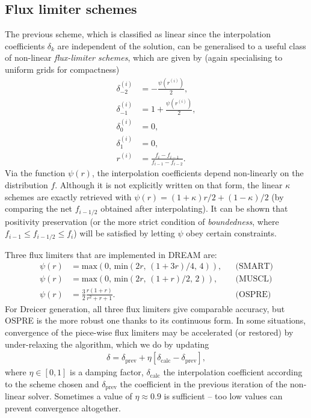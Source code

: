 \documentclass{notes}
\begin{document}
    \subsection{Flux limiter schemes}
    The previous scheme, which is classified as linear since the interpolation 
    coefficients $\delta_k$ are independent of the solution, can be generalised to a 
    useful class of non-linear \emph{flux-limiter schemes}, which are given by
    (again specialising to uniform grids for compactness)
    \begin{align}
    \delta^{(i)}_{-2} &= -\frac{\psi(r^{(i)})}{2}, \nonumber \\
    \delta^{(i)}_{-1} &= 1 + \frac{\psi(r^{(i)})}{2}, \nonumber \\
    \delta^{(i)}_{0} &= 0, \nonumber \\
    \delta^{(i)}_{1} &= 0, \nonumber \\
    r^{(i)} &= \frac{f_i - f_{i-1}}{f_{i-1}-f_{i-2}}.
    \end{align}
    Via the function $\psi(r)$, the interpolation coefficients depend non-linearly on 
    the distribution $f$. Although it is not explicitly written on that form, the linear $\kappa$ schemes 
    are exactly retrieved with $\psi(r) = (1+\kappa)r/2 + (1-\kappa)/2$ (by comparing the net $f_{i-1/2}$ 
    obtained after interpolating). It can be shown that positivity preservation (or the more strict condition 
    of \emph{boundedness}, where $f_{i-1} \leq f_{i-1/2} \leq f_i$)
    will be satisfied by letting $\psi$ obey certain constraints.
    
    Three flux limiters that are implemented in DREAM are:
    \begin{align}
    \psi(r) &= \text{max}(0,\,\text{min}(2r,\,(1+3r)/4,\,4)), && \text{(SMART)} \nonumber \\
    \psi(r) &= \text{max}(0,\,\text{min}(2r,\,(1+r)/2,\,2)), && \text{(MUSCL)} \nonumber \\
    \psi(r) &= \frac{3}{2}\frac{r(1+r)}{r^2+r+1}. && \text{(OSPRE)}
    \end{align}
    For Dreicer generation, all three flux limiters give comparable accuracy, but OSPRE is the 
    more robust one thanks to its continuous form. 
    In some situations, convergence of the piece-wise flux limiters may be accelerated (or restored)
    by under-relaxing the algorithm, which we do by updating
    \begin{align}
    \delta = \delta_\text{prev} + \eta [\delta_\text{calc} - \delta_\text{prev}],
    \end{align}
    where $\eta \in [0,1]$ is a damping factor, $\delta_\text{calc}$ the interpolation coefficient
    according to the scheme chosen and $\delta_\text{prev}$ the coefficient in the previous iteration 
    of the non-linear solver. Sometimes a value of $\eta \approx 0.9$ is sufficient -- too low
    values can prevent convergence altogether.
    
\end{document}
